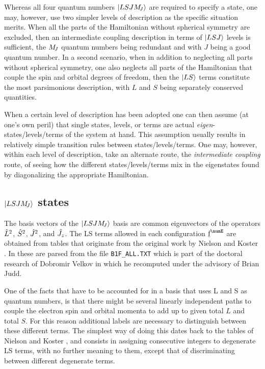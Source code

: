 \documentclass{article}
\newcommand{\codetext}[1]{{\color{BlueViolet} \texttt{#1}}}
\begin{document}
Whereas all four quantum numbers $|LSJM_{\!{J}}\rangle$ are required to specify a state, one may, however, use two simpler levels of description as the specific situation merits. When all the parts of the Hamiltonian without spherical symmetry are excluded, then an intermediate coupling description in terms of $|LSJ\rangle$ levels is sufficient, the $M_{\!{J}}$ quantum numbers being redundant and with $J$ being a good quantum number. In a second scenario, when in addition to neglecting all parts without spherical symmetry, one also neglects all parts of the Hamiltonian that couple the spin and orbital degrees of freedom, then the $|LS\rangle$ terms constitute the most parsimonious description, with $L$ and $S$ being separately conserved quantities.

When a certain level of description has been adopted one can then assume (at one's own peril) that single states, levels, or terms are actual \textit{eigen}-states/levels/terms of the system at hand. This assumption usually results in relatively simple transition rules between states/levels/terms. One may, however, within each level of description, take an alternate route, the \textit{intermediate coupling} route, of seeing how the different states/levels/terms mix in the eigenstates found by diagonalizing the appropriate Hamiltonian.


\subsection{$|LSJM_{\!{J}}\rangle$ states}

The basis vectors of the $|LSJM_{\!{J}}\rangle$ basis are common eigenvectors of the operators $\hat{L}^2$, $\hat{S}^2$, $\hat{J}^2$, and $\hat{J}_z$. The LS terms allowed in each configuration $\forb^\numE$ are obtained from tables that originate from the original work by Nielson and Koster \cite{nielson_spectroscopic_1963}. In \qlanth these are parsed from the file \codetext{B1F\_ALL.TXT} which is part of the doctoral research of Dobromir Velkov \cite{velkov_multi-electron_2000} in which he recomputed \cfps under the advisory of Brian Judd. 

One of the facts that have to be accounted for in a basis that uses L and S as quantum numbers, is that there might be several linearly independent paths to couple the electron spin and orbital momenta to add up to given total $L$ and total $S$. For this reason additional labels are necessary to distinguish between these different terms. The simplest way of doing this dates back to the tables of Nielson and Koster \cite{nielson_spectroscopic_1963}, and consists in assigning consecutive integers to degenerate LS terms, with no further meaning to them, except that of discriminating between different degenerate terms. 
 
\end{document}
